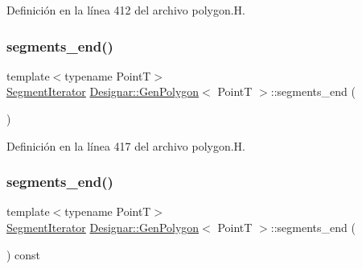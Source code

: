 Definición en la línea 412 del archivo polygon.\+H.

\mbox{\label{class_designar_1_1_gen_polygon_a1812e03e19df8a1363989b271955ea66}} 
\subsubsection{\texorpdfstring{segments\+\_\+end()}{segments\_end()}\hspace{0.1cm}{\footnotesize\ttfamily [1/2]}}
{\footnotesize\ttfamily template$<$typename PointT$>$ \\
\hyperlink{class_designar_1_1_gen_polygon_1_1_segment_iterator}{Segment\+Iterator} \hyperlink{class_designar_1_1_gen_polygon}{Designar\+::\+Gen\+Polygon}$<$ PointT $>$\+::segments\+\_\+end (\begin{DoxyParamCaption}{ }\end{DoxyParamCaption})\hspace{0.3cm}{\ttfamily [inline]}}



Definición en la línea 417 del archivo polygon.\+H.

\mbox{\label{class_designar_1_1_gen_polygon_aa8e70075cae9a4a726bc8635d2cd527b}} 
\subsubsection{\texorpdfstring{segments\+\_\+end()}{segments\_end()}\hspace{0.1cm}{\footnotesize\ttfamily [2/2]}}
{\footnotesize\ttfamily template$<$typename PointT$>$ \\
\hyperlink{class_designar_1_1_gen_polygon_1_1_segment_iterator}{Segment\+Iterator} \hyperlink{class_designar_1_1_gen_polygon}{Designar\+::\+Gen\+Polygon}$<$ PointT $>$\+::segments\+\_\+end (\begin{DoxyParamCaption}{ }\end{DoxyParamCaption}) const\hspace{0.3cm}{\ttfamily [inline]}}



